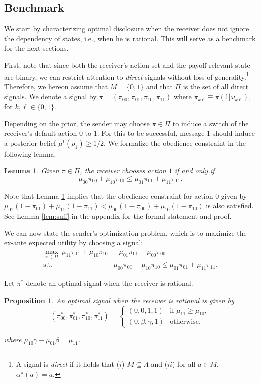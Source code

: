 \documentclass[12pt,english]{article}
\newtheorem{proposition}{Proposition}
\newtheorem{lemma}{Lemma}
\theoremstyle{plain}
\begin{document}
\subsection{Benchmark}
We start by characterizing optimal disclosure when the receiver does not ignore the dependency of states, i.e., when he is  rational. 
This will serve as a benchmark for the next sections. 

First, note that since both the receiver's action set and the payoff-relevant state are binary, we can restrict attention to \emph{direct} signals without loss of generality.\footnote{A signal is \emph{direct} if it holds that ($i$) $M\subseteq A$ and ($ii$) for all $a\in M$, $\alpha^{\pi}(a)=a$.}
Therefore, we hereon assume that $M=\{0,1\}$ and that $\Pi$ is the set of all direct signals.  
We denote a signal by $\pi=(\pi_{00},\pi_{01},\pi_{10},\pi_{11})$ where $\pi_{k\ell}\equiv\pi(1\vert\omega_{k\ell})$, for $k,\ell\in\{0,1\}$.
 
Depending on the prior, the sender may choose $\pi\in\Pi$ to induce a switch of the receiver's default action $0$ to $1$.
For this to be successful, message $1$ should induce a posterior belief $\mu^{1}(\rho_1)\geq 1/2$.
We formalize the obedience constraint in the following lemma. 

\begin{lemma}\label{lem:str}
Given $\pi\in\Pi$, the receiver chooses action $1$ if and only if $$\mu_{00}\pi_{00}+\mu_{10}\pi_{10}\leq \mu_{01}\pi_{01}+\mu_{11}\pi_{11}.$$
\end{lemma}

Note that Lemma \ref{lem:str} implies that the obedience constraint for action $0$ given by $\mu_{01}(1-\pi_{01})+\mu_{11}(1-\pi_{11})<\mu_{00}(1-\pi_{00})+\mu_{10}(1-\pi_{10})$ is also satisfied. 
See Lemma \ref{lem:suff} in the appendix for the formal statement and proof. 

We can now state the sender's optimization problem, which is to maximize the ex-ante expected utility by choosing a signal:
\begin{align}
\max_{\pi\in\Pi}\: \mu_{11}\pi_{11}+\mu_{10}\pi_{10}&-\mu_{01}\pi_{01}-\mu_{00}\pi_{00}\nonumber\\
\text{s.t. } &\mu_{00}\pi_{00}+\mu_{10}\pi_{10}\leq \mu_{01}\pi_{01}+\mu_{11}\pi_{11}.\label{OP_soph}
\end{align}

Let $\pi^*$ denote an optimal signal when the receiver is rational.

\begin{proposition}\label{prop:bench}
An optimal signal when the receiver is rational is given by 
\begin{equation*}
(\pi^*_{00},\pi^*_{01},\pi^*_{10},\pi^*_{11})=\begin{cases}
(0,0,1,1) & \text{if }\mu_{11}\geq\mu_{10},\\
(0,\beta,\gamma,1) & \text{otherwise},
\end{cases}
\end{equation*}

\noindent where $\mu_{10}\gamma-\mu_{01}\beta=\mu_{11}$.
\end{proposition}
\end{document}
